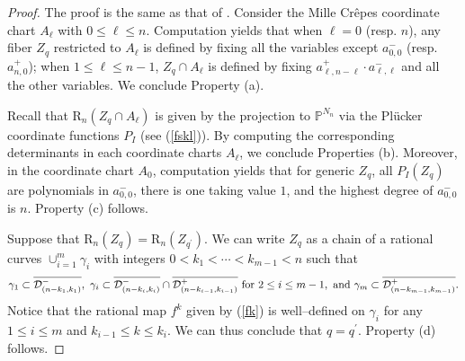 \documentclass[10pt]{amsart}
\theoremstyle{definition}
\newcommand{\RL}{\mathrm{R}}
\theoremstyle{plain} %
\begin{document}
\begin{proof} %
The proof is the same as that of \cite[Lemma 4.22]{FW}. Consider the Mille Cr\^epes coordinate chart $A_{\ell}$ with $0\leq \ell\leq n$. Computation yields that when $\ell=0$ (resp. $n$), any fiber $Z_q$ restricted to $A_{\ell}$ is defined by fixing all the variables except $a^-_{0,0}$ (resp. $a^+_{n,0}$); when $1\leq \ell\leq n-1$, $Z_q\cap A_{\ell}$ is defined by fixing $a^+_{\ell,n-\ell}\cdot a^-_{\ell,\ell}$ and all the other variables. We conclude Property (a).

Recall that $\RL_n(Z_q\cap A_{\ell})$ is given by the projection to $\mathbb P^{N_{n}}$ via the Pl\"ucker coordinate functions $P_I$ (see (\ref{fskl})). By computing the corresponding determinants in each coordinate charts $A_{\ell}$, we  conclude Properties (b). Moreover,  in the coordinate chart $A_{0}$, computation yields that for generic $Z_q$, all $P_I(Z_q)$ are polynomials in $a^-_{0,0}$, there is one taking value $1$, and the highest degree of $a^-_{0,0}$ is $n$. Property (c) follows. 



Suppose that $\RL_{n}(Z_q)=\RL_{n}(Z_{q^{\prime}})$. We can write $Z_q$ as a chain of a rational curves $\cup_{i=1}^m\gamma_i$ with integers $0< k_1<\cdots<k_{m-1}<n$ such that 
$$\gamma_{1}\subset \overline{\mathcal D_{(n-k_1,k_1)}^-},\,\,\gamma_{i}\subset \overline{\mathcal D_{(n-k_i,k_i)}^-}\cap\overline{\mathcal D_{(n-k_{i-1},k_{i-1})}^+}\,\,{\rm for\,\,}2\leq i\leq m-1,\,\,{\rm and\,\,}\gamma_{m}\subset \overline{\mathcal D_{(n-k_{m-1},k_{m-1})}^+}.$$
Notice that the rational map $f^k$ given by (\ref{fk}) is well--defined on $\gamma_i$ for any $1\leq i\leq m$ and $k_{i-1}\leq k\leq k_i$. We can thus conclude that $q=q^{\prime}$. Property (d) follows.
\end{proof}
\end{document}
